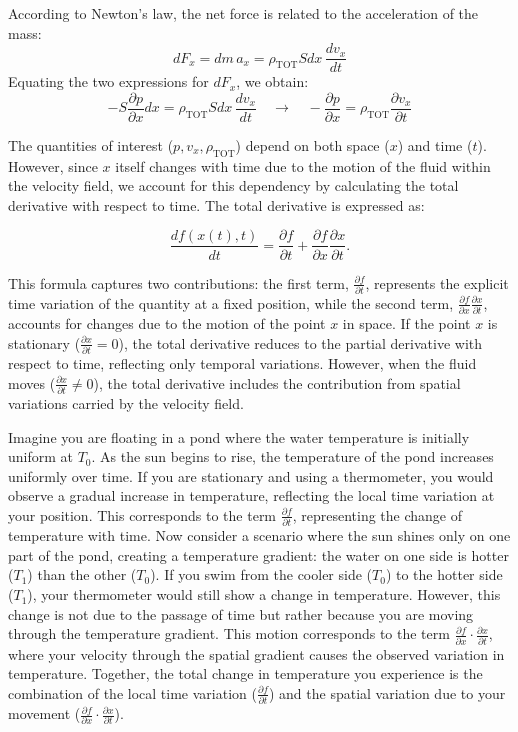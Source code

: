 \documentclass[a4paper]{article}
\begin{document}
According to Newton's law, the net force is related to the acceleration of the mass:
\[
dF_x = dm \, a_x = \rho_\text{TOT} S dx \, \frac{dv_x}{dt}
\]
Equating the two expressions for \(dF_x\), we obtain:
\[
-S \frac{\partial p}{\partial x} dx = \rho_\text{TOT} S dx \, \frac{dv_x}{dt}
\quad \to \quad
-\frac{\partial p}{\partial x} = \rho_\text{TOT} \frac{\partial v_x}{\partial t}
\]

The quantities of interest (\(p, v_x, \rho_\text{TOT}\)) depend on both space (\(x\)) and time (\(t\)). However, since \(x\) itself changes with time due to the motion of the fluid within the velocity field, we account for this dependency by calculating the total derivative with respect to time. The total derivative is expressed as:

\[
\frac{df(x(t),t)}{dt} = \frac{\partial f}{\partial t} + \frac{\partial f}{\partial x} \frac{\partial x}{\partial t}.
\]

This formula captures two contributions: the first term, \(\frac{\partial f}{\partial t}\), represents the explicit time variation of the quantity at a fixed position, while the second term, \(\frac{\partial f}{\partial x} \frac{\partial x}{\partial t}\), accounts for changes due to the motion of the point \(x\) in space. If the point \(x\) is stationary (\(\frac{\partial x}{\partial t} = 0\)), the total derivative reduces to the partial derivative with respect to time, reflecting only temporal variations. However, when the fluid moves (\(\frac{\partial x}{\partial t} \neq 0\)), the total derivative includes the contribution from spatial variations carried by the velocity field.


Imagine you are floating in a pond where the water temperature is initially uniform at \(T_0\). As the sun begins to rise, the temperature of the pond increases uniformly over time. If you are stationary and using a thermometer, you would observe a gradual increase in temperature, reflecting the local time variation at your position. This corresponds to the term \(\frac{\partial f}{\partial t}\), representing the change of temperature with time. Now consider a scenario where the sun shines only on one part of the pond, creating a temperature gradient: the water on one side is hotter (\(T_1\)) than the other (\(T_0\)). If you swim from the cooler side (\(T_0\)) to the hotter side (\(T_1\)), your thermometer would still show a change in temperature. However, this change is not due to the passage of time but rather because you are moving through the temperature gradient. This motion corresponds to the term \(\frac{\partial f}{\partial x} \cdot \frac{\partial x}{\partial t}\), where your velocity through the spatial gradient causes the observed variation in temperature. Together, the total change in temperature you experience is the combination of the local time variation (\(\frac{\partial f}{\partial t}\)) and the spatial variation due to your movement (\(\frac{\partial f}{\partial x} \cdot \frac{\partial x}{\partial t}\)).
\end{document}
